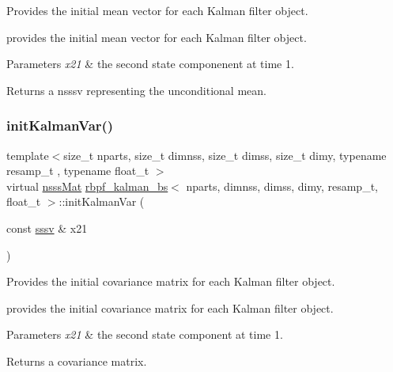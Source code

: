 Provides the initial mean vector for each Kalman filter object. 

provides the initial mean vector for each Kalman filter object. 
\begin{DoxyParams}{Parameters}
{\em x21} & the second state componenent at time 1. \\
\hline
\end{DoxyParams}
\begin{DoxyReturn}{Returns}
a nsssv representing the unconditional mean. 
\end{DoxyReturn}
\mbox{\label{classrbpf__kalman__bs_add33853e65897cc359965d3715e4e20f}} 
\subsubsection{\texorpdfstring{init\+Kalman\+Var()}{initKalmanVar()}}
{\footnotesize\ttfamily template$<$size\+\_\+t nparts, size\+\_\+t dimnss, size\+\_\+t dimss, size\+\_\+t dimy, typename resamp\+\_\+t , typename float\+\_\+t $>$ \\
virtual \hyperlink{classrbpf__kalman__bs_a0d3dfd24b849c0bf33fa3df8ce56dd07}{nsss\+Mat} \hyperlink{classrbpf__kalman__bs}{rbpf\+\_\+kalman\+\_\+bs}$<$ nparts, dimnss, dimss, dimy, resamp\+\_\+t, float\+\_\+t $>$\+::init\+Kalman\+Var (\begin{DoxyParamCaption}\item[{const \hyperlink{classrbpf__kalman__bs_a2b40c9fa0d7a2ca42be3d0c43db0db8b}{sssv} \&}]{x21 }\end{DoxyParamCaption})\hspace{0.3cm}{\ttfamily [pure virtual]}}



Provides the initial covariance matrix for each Kalman filter object. 

provides the initial covariance matrix for each Kalman filter object. 
\begin{DoxyParams}{Parameters}
{\em x21} & the second state component at time 1. \\
\hline
\end{DoxyParams}
\begin{DoxyReturn}{Returns}
a covariance matrix. 
\end{DoxyReturn}
\mbox{\label{classrbpf__kalman__bs_addafd7af8bf500d23a09aad34bf9cf0b}} 
